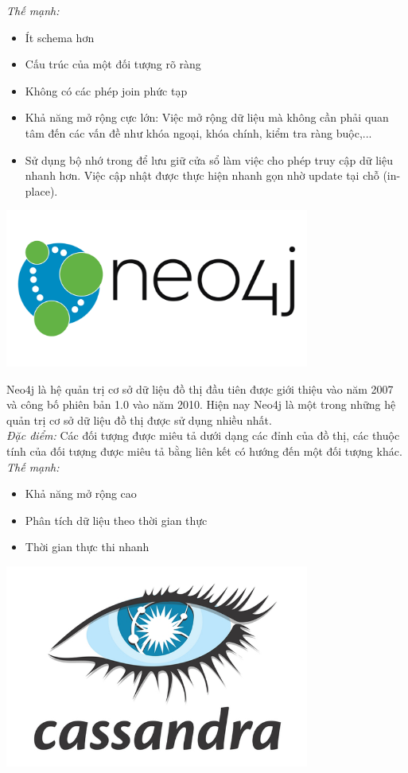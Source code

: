 \textit{Thế mạnh:}
\begin{itemize}
    \item Ít schema hơn
    \item Cấu trúc của một đối tượng rõ ràng
    \item Không có các phép join phức tạp
    \item Khả năng mở rộng cực lớn: Việc mở rộng dữ liệu mà không cần phải quan tâm đến các vấn đề như khóa ngoại, khóa chính, kiểm tra ràng buộc,...
    \item Sử dụng bộ nhớ trong để lưu giữ cửa sổ làm việc cho phép truy cập dữ liệu nhanh hơn. Việc cập nhật được thực hiện nhanh gọn nhờ update tại chỗ (in-place).
\end{itemize}
\begin{center}
  \captionsetup{type=figure}
  \includegraphics[width=10cm]{img/neo4j.png}
\end{center}

Neo4j là hệ quản trị cơ sở dữ liệu đồ thị đầu tiên được giới thiệu vào năm 2007 và công bố phiên bản 1.0 vào năm 2010. Hiện nay Neo4j là một trong những hệ quản trị cơ sở dữ liệu đồ thị được sử dụng nhiều nhất.\\

\textit{Đặc điểm:} Các đối tượng được miêu tả dưới dạng các đỉnh của đồ thị, các thuộc tính của đối tượng được miêu tả bằng liên kết có hướng đến một đối tượng khác.\\

\textit{Thế mạnh:}
\begin{itemize}
    \item Khả năng mở rộng cao
    \item Phân tích dữ liệu theo thời gian thực
    \item Thời gian thực thi nhanh
\end{itemize}
\begin{center}
  \captionsetup{type=figure}
  \includegraphics[width=10cm]{img/cassandra.png}
\end{center}
